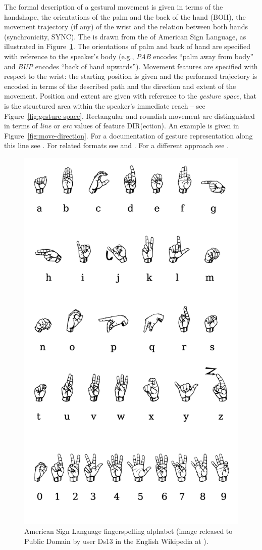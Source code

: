 \documentclass[output=paper]{langsci/langscibook}
\begin{document}
The formal description of a gestural movement is given in terms of the handshape, the orientations of the palm and the back of the hand (BOH), the movement trajectory (if any) of the wrist and the relation between both hands (synchronicity, SYNC). 
%
The  is drawn from the  of American Sign Language, as illustrated in Figure~\ref{fig:asl}.
%
The orientations of palm and back of hand are specified with reference to the speaker's body (e.g., \textit{PAB} encodes \enquote{palm away from body} and \textit{BUP} encodes \enquote{back of hand upwards}). 
%
Movement features are specified with respect to the wrist: the starting position is given and the performed trajectory is encoded in terms of the described path and the direction and extent of the movement.
%
Position and extent are given with reference to the \emph{gesture space}, that is the structured area within the speaker's immediate reach \citep{McNeill:1992} -- see Figure~\ref{fig:gesture-space}. 
%
Rectangular and roundish movement are distinguished in terms of \textit{line} or \textit{arc} values of feature DIR(ection).
%
An example is given in Figure~\ref{fig:move-direction}.
%
For a documentation of gesture representation along this line see \citet{FIGURE:annotation}.
%
For related formats see \citet{Martell:Osborn:Friedman:Howard:2002} and \citet{Gibbon:et:al:2003}.
%
For a different approach see \citet{Lausberg:Sloetjes:2009}.


\begin{figure}[tb]
  \centering
  \includegraphics[width=0.5\linewidth]{figures/ASL_alphabet_gallaudet}
  \caption[ASL]{American Sign Language fingerspelling alphabet (image released to Public Domain by user Ds13 in the English Wikipedia at ).}
  \label{fig:asl}
\end{figure}
\end{document}
